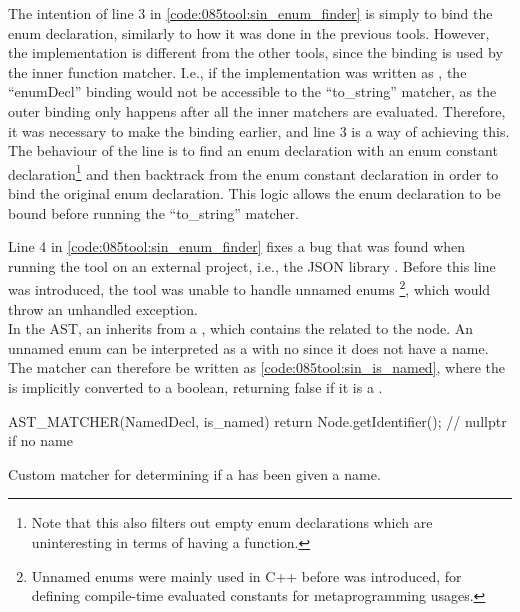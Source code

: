 The intention of line 3 in \cref{code:085tool:sin_enum_finder} is simply to bind the enum declaration, similarly to how it was done in the previous tools.
However, the implementation is different from the other tools, since the binding is used by the inner  function matcher.
I.e., if the implementation was written as , the ``enumDecl'' binding would not be accessible to the ``to\_string'' matcher, as the outer binding only happens after all the inner matchers are evaluated.
Therefore, it was necessary to make the binding earlier, and line 3 is a way of achieving this.\\
The behaviour of the line is to find an enum declaration with an enum constant declaration\footnote{
    Note that this also filters out empty enum declarations which are uninteresting in terms of having a  function.
} and then backtrack from the enum constant declaration in order to bind the original enum declaration. This logic allows the enum declaration to be bound before running the ``to\_string'' matcher.

Line 4 in \cref{code:085tool:sin_enum_finder} fixes a bug that was found when running the tool on an external project, i.e., the JSON library \cite{lohmannJSONModern2022}.
Before this line was introduced, the tool was unable to handle unnamed enums
\footnote{
    Unnamed enums were mainly used in C++ before  was introduced, for defining compile-time evaluated constants for metaprogramming usages.
}, which would throw an unhandled exception.\\
In the AST, an  inherits from a , which contains the  related to the node.
An unnamed enum can be interpreted as a  with no  since it does not have a name.
The matcher can therefore be written as \cref{code:085tool:sin_is_named}, where the  is implicitly converted to a boolean, returning false if it is a .

\begin{listing}[H]
    \begin{cppcode}
AST_MATCHER(NamedDecl, is_named) {
	return Node.getIdentifier(); // nullptr if no name
}
    \end{cppcode}
    \caption{Custom matcher for determining if a  has been given a name.}
    \label{code:085tool:sin_is_named}
\end{listing}

